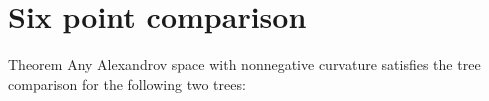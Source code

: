 \section{Six point comparison}


\begin{thm}{Theorem}
Any Alexandrov space with nonnegative curvature satisfies the tree comparison for the following two trees:

\begin{comment}
\begin{center}
\begin{tikzpicture}[scale=1,
  thick,main node/.style={circle,draw,font=\sffamily\bfseries,minimum size=3mm}]
  \node[main node] (1) at (0,0) {};
  \node[main node] (2) at (0,1){};
  \node[main node] (3) at (0,2){};
  \node[main node] (4) at (1,0) {};
  \node[main node] (5) at (1,1) {};
  

  \path[every node/.style={font=\sffamily\small}]
   (1) edge node[above]{}(2)
   (2) edge node[above]{}(3)
   (2) edge node[above]{}(5)
   (4) edge node[above]{}(5);
\end{tikzpicture}
\hskip10mm
\begin{tikzpicture}[scale=1,
  thick,main node/.style={circle,draw,font=\sffamily\bfseries,minimum size=3mm}]

  \node[main node] (1) at (0,0) {};
  \node[main node] (2) at (0,1){};
  \node[main node] (3) at (0,2){};
  \node[main node] (4) at (1,0) {};
  \node[main node] (5) at (1,1) {};
  \node[main node] (6) at (1,2) {};

  \path[every node/.style={font=\sffamily\small}]
   (1) edge node[above]{}(2)
   (2) edge node[above]{}(3)
   (2) edge node[above]{}(5)
   (4) edge node[above]{}(5)
   (5) edge node[above]{}(6);
\end{tikzpicture}
\hskip10mm
\begin{tikzpicture}[scale=1,
  thick,main node/.style={circle,draw,font=\sffamily\bfseries,minimum size=3mm}]

  \node[main node] (1) at (0,1) {};
  \node[main node] (2) at (1,0){};
  \node[main node] (3) at (1,1){};
  \node[main node] (4) at (1,2) {};
  \node[main node] (5) at (2,0) {};
  \node[main node] (6) at (2,1) {};

  \path[every node/.style={font=\sffamily\small}]
   (1) edge node[above]{}(3)
   (2) edge node[above]{}(3)
   (3) edge node[above]{}(6)
   (4) edge node[above]{}(3)
   (5) edge node[above]{}(6);
\end{tikzpicture}
\end{center}
\end{comment}

\end{thm}


